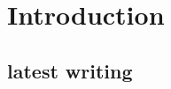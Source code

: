 \ifCLASSOPTIONcompsoc
{}
\else
\section{Introduction}
\label{sec:introduction}
\fi




% 
% 
% 
% 
%
% 

\hfill \break
\hfill \break
\subsection*{latest writing}
\hfill \break
\hfill \break

